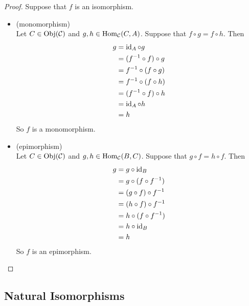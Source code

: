 \documentclass{book}
\begin{document}
	\begin{proof}
		Suppose that $f$ is an isomorphism. 
		\begin{itemize}
			\item (monomorphism) \\
			Let $C \in \operatorname{Obj}(\mathcal{C})$ and $g, h \in \operatorname{Hom}_{\mathcal{C}}(C, A)$. Suppose that $f \circ g = f \circ h$. Then
			\begin{align*}
				g 
				& = \operatorname{id}_A \circ g \\
				& = (f^{-1} \circ f) \circ g \\
				& = f^{-1} \circ (f \circ g) \\
				& = f^{-1} \circ (f \circ h) \\
				& = (f^{-1} \circ f) \circ h \\
				& = \operatorname{id}_A \circ h \\
				& = h
			\end{align*}
			So $f$ is a monomorphism.
			\item  (epimorphism) \\
			Let $C \in \operatorname{Obj}(\mathcal{C})$ and $g, h \in \operatorname{Hom}_{\mathcal{C}}(B, C)$. Suppose that $ g \circ f = h \circ f$. Then
			\begin{align*}
				g 
				& = g \circ \operatorname{id}_B \\
				& = g \circ (f \circ f^{-1}) \\
				& = (g \circ f) \circ f^{-1} \\
				& = (h \circ f) \circ f^{-1} \\
				& = h \circ (f \circ f^{-1}) \\
				& = h \circ \operatorname{id}_B \\
				& = h
			\end{align*}
			So $f$ is an epimorphism.
		\end{itemize}
	\end{proof}






























	
	\subsection{Natural Isomorphisms}
	
\end{document}
